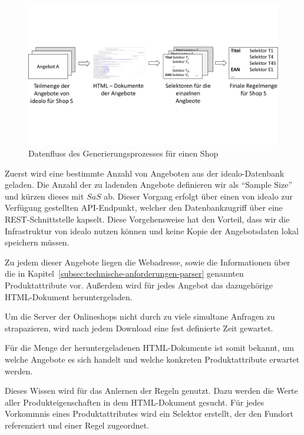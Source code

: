 \begin{figure}[H]
    \centering
    \includegraphics[width=\textwidth, trim=0 5cm 0 5cm, clip]{resources/Datenfluss-SRG.pdf}
    \caption{Datenfluss des Generierungsprozesses für einen Shop}
    \label{abb:datenfluss-srg}
    \vspace{-0.5cm}
\end{figure}

Zuerst wird eine bestimmte Anzahl von Angeboten aus der idealo-Datenbank geladen.
Die Anzahl der zu ladenden Angebote definieren wir als ``Sample Size'' und kürzen dieses mit $SaS$ ab.
Dieser Vorgang erfolgt über einen von idealo zur Verfügung gestellten API-Endpunkt, welcher den Datenbankzugriff über
eine REST-Schnittstelle kapselt.
Diese Vorgehensweise hat den Vorteil, dass wir die Infrastruktur von idealo nutzen können und keine Kopie der
Angebotsdaten lokal speichern müssen.

Zu jedem dieser Angebote liegen die Webadresse, sowie die Informationen über die in
Kapitel~\ref{subsec:technische-anforderungen-parser} genannten Produktattribute vor.
Außerdem wird für jedes Angebot das dazugehörige HTML-Dokument heruntergeladen.

Um die Server der Onlineshops nicht durch zu viele simultane Anfragen zu strapazieren, wird nach jedem
Download eine fest definierte Zeit gewartet.

Für die Menge der heruntergeladenen HTML-Dokumente ist somit bekannt, um welche Angebote es sich handelt und welche
konkreten Produktattribute erwartet werden.

Dieses Wissen wird für das Anlernen der Regeln genutzt.
Dazu werden die Werte aller Produkteigenschaften in dem HTML-Dokument gesucht.
Für jedes Vorkommnis eines Produktattributes wird ein Selektor erstellt, der den Fundort referenziert und einer Regel
zugeordnet.

